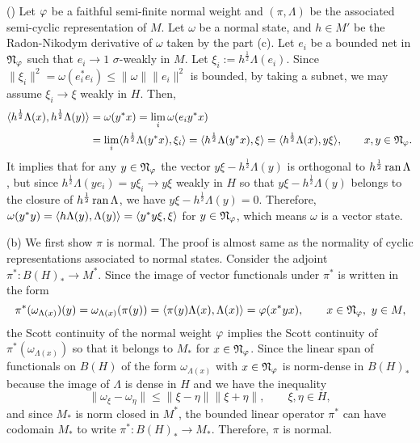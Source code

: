 \documentclass{../../large}
\begin{document}
\begin{pf}
()
Let $\varphi$ be a faithful semi-finite normal weight and $(\pi,\Lambda)$ be the associated semi-cyclic representation of $M$.
Let $\omega$ be a normal state, and $h\in M'$ be the Radon-Nikodym derivative of $\omega$ taken by the part (c).
Let $e_i$ be a bounded net in $\mathfrak{N}_\varphi$ such that $e_i\to1$ $\sigma$-weakly in $M$.
Let $\xi_i:=h^{\frac12}\Lambda(e_i)$.
Since $\|\xi_i\|^2=\omega(e_i^*e_i)\le\|\omega\|\|e_i\|^2$ is bounded, by taking a subnet, we may assume $\xi_i\to\xi$ weakly in $H$.
Then,
\begin{align*}
\langle h^{\frac12}\Lambda(x),h^{\frac12}\Lambda(y)\rangle
&=\omega(y^*x)=\lim_i\omega(e_iy^*x)\\
&=\lim_i\langle h^{\frac12}\Lambda(y^*x),\xi_i\rangle=\langle h^{\frac12}\Lambda(y^*x),\xi\rangle=\langle h^{\frac12}\Lambda(x),y\xi\rangle,\qquad x,y\in\mathfrak{N}_\varphi.
\end{align*}
It implies that for any $y\in\mathfrak{N}_\varphi$ the vector $y\xi-h^{\frac12}\Lambda(y)$ is orthogonal to $h^{\frac12}\operatorname{ran}\Lambda$, but since $h^{\frac12}\Lambda(ye_i)=y\xi_i\to y\xi$ weakly in $H$ so that $y\xi-h^{\frac12}\Lambda(y)$ belongs to the closure of $h^{\frac12}\operatorname{ran}\Lambda$, we have $y\xi-h^{\frac12}\Lambda(y)=0$.
Therefore, $\omega(y^*y)=\langle h\Lambda(y),\Lambda(y)\rangle=\langle y^*y\xi,\xi\rangle$ for $y\in\mathfrak{N}_\varphi$, which means $\omega$ is a vector state.
\fi


(b)
We first show $\pi$ is normal.
The proof is almost same as the normality of cyclic representations associated to normal states.
Consider the adjoint $\pi^*:B(H)_*\to M^*$.
Since the image of vector functionals under $\pi^*$ is written in the form
\[\pi^*(\omega_{\Lambda(x)})(y)=\omega_{\Lambda(x)}(\pi(y))=\langle\pi(y)\Lambda(x),\Lambda(x)\rangle=\varphi(x^*yx),\qquad x\in\mathfrak{N}_\varphi,\ y\in M,\]
the Scott continuity of the normal weight $\varphi$ implies the Scott continuity of $\pi^*(\omega_{\Lambda(x)})$ so that it belongs to $M_*$ for $x\in\mathfrak{N}_\varphi$.
Since the linear span of functionals on $B(H)$ of the form $\omega_{\Lambda(x)}$ with $x\in\mathfrak{N}_\varphi$ is norm-dense in $B(H)_*$ because the image of $\Lambda$ is dense in $H$ and we have the inequality
\[\|\omega_\xi-\omega_\eta\|\le\|\xi-\eta\|\|\xi+\eta\|,\qquad\xi,\eta\in H,\]
and since $M_*$ is norm closed in $M^*$, the bounded linear operator $\pi^*$ can have codomain $M_*$ to write $\pi^*:B(H)_*\to M_*$.
Therefore, $\pi$ is normal.


\end{pf}
\end{document}

